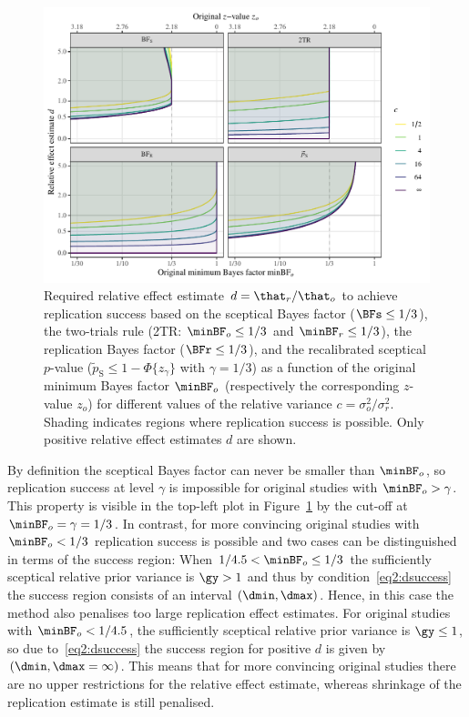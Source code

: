 \begin{figure}[!htb]
\begin{knitrout}
\color{fgcolor}
\includegraphics[width=\maxwidth]{images/paper2/plot-success-region-comparison-1}
\end{knitrout}
\caption{Required relative effect estimate $d = \that_{r}/\that_{o}$ to achieve
  replication success based on the sceptical Bayes factor
  ($\BFs \leq 1/3$), the two-trials rule (2TR:
  $\minBF_{o} \leq 1/3$ and $\minBF_{r} \leq 1/3$),
  the replication Bayes factor ($\BFr \leq 1/3$), and the
  recalibrated sceptical $p$-value
  ($\tilde{p}_{\mathrm{S}} \leq 1 - \Phi\{z_{\gamma}\}$ with
  $\gamma = 1/3$) as a function of the original minimum
  Bayes factor $\minBF_{o}$ (respectively the corresponding $z$-value $z_{o}$)
  for different values of the relative variance
  $c = \sigma^{2}_{o}/\sigma^{2}_{r}$. Shading indicates regions where
  replication success is possible. Only positive relative effect estimates $d$
  are shown.}
\label{fig2:dcomparison}
\end{figure}

By definition the sceptical Bayes factor can never be smaller than $\minBF_{o}$,
so replication success at level $\gamma$ is impossible for original studies with
$\minBF_{o} > \gamma$. This property is visible in the top-left plot in
Figure~\ref{fig2:dcomparison} by the cut-off at $\minBF_{o} = \gamma = 1/3$. In
contrast, for more convincing original studies with $\minBF_{o} < 1/3$
replication success is possible and two cases can be distinguished in terms of
the success region: When $1/4.5 < \minBF_{o} \leq 1/3$ the
sufficiently sceptical relative prior variance is $\gy > 1$ and thus by
condition~\eqref{eq2:dsuccess} the success region consists of an interval
$(\dmin, \dmax)$. Hence, in this case the method also penalises too large
replication effect estimates. For original studies with
$\minBF_{o} < 1/4.5$, the sufficiently sceptical relative prior
variance is $\gy \leq 1$, so due to~\eqref{eq2:dsuccess} the success region for
positive $d$ is given by $(\dmin, \dmax = \infty)$. This means that for more
convincing original studies there are no upper restrictions for the relative
effect estimate, whereas shrinkage of the replication estimate is still
penalised.

